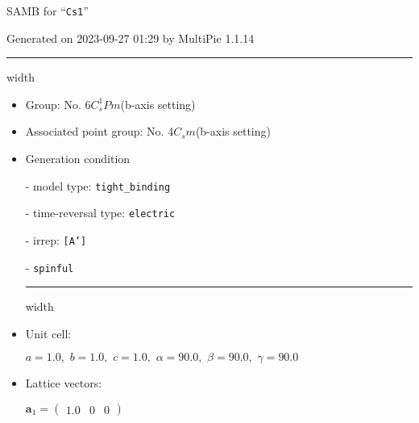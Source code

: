 \documentclass[fleqn,10pt,landscape]{article}
\begin{document}
\setcounter{MaxMatrixCols}{16}

\setlength{\baselineskip}{16pt}
\footnotesize
\begin{center}
\LARGE
SAMB for ``\texttt{Cs1}''
\end{center}
\begin{flushright}
Generated on 2023-09-27 01:29 by MultiPie 1.1.14
\end{flushright}
\vspace{1cm}


 \hfil \hrule height 1mm width \textwidth \hfil

\begin{itemize}
\item Group: No. 6\quad$C_{s}^{1}$\quad$Pm$\quad(b-axis setting)\quad[ monoclinic ]

\item Associated point group: No. 4\quad$C_{s}$\quad$m$\quad(b-axis setting)\quad[ monoclinic ]

\vspace{5mm}

\item Generation condition

\quad - model type: \texttt{tight_binding}

\quad - time-reversal type: \texttt{electric}

\quad - irrep: \texttt{[A']}

\quad - \texttt{spinful}


 \hfil \hrule height 1mm width \textwidth \hfil

\item Unit cell:

\quad $a=1.0,\,\, b=1.0,\,\, c=1.0,\,\, \alpha=90.0,\,\, \beta=90.0,\,\, \gamma=90.0$

\item Lattice vectors:

\quad $\bm{a}_1=\begin{pmatrix} 1.0 & 0 & 0 \end{pmatrix}$


\end{itemize}
\end{document}
